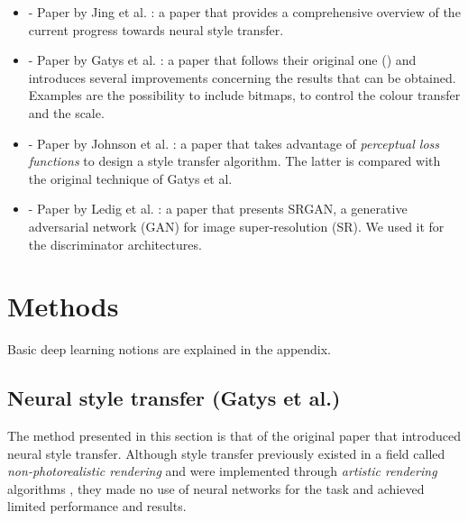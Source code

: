 \documentclass[twocolumn,superscriptaddress,aps,floatfix,nofootinbib]{revtex4-1}
\begin{document}
    \begin{itemize}
        \item \cite{DBLP:journals/corr/JingYFYS17} - Paper by Jing et al. :  a paper that provides a comprehensive overview of the current progress towards neural style transfer.
        \item \cite{DBLP:journals/corr/GatysEBHS16} - Paper by Gatys et al. : a paper that follows their original one (\cite{DBLP:journals/corr/GatysEB15a}) and introduces several improvements concerning the results that can be obtained. Examples are the possibility to include bitmaps, to control the colour transfer and the scale.
        \item \cite{DBLP:journals/corr/JohnsonAL16} - Paper by Johnson et al. : a paper that takes advantage of \emph{perceptual loss functions} to design a style transfer algorithm. The latter is compared with the original technique of Gatys et al.
        \item \cite{DBLP:journals/corr/LedigTHCATTWS16} - Paper by Ledig et al. : a paper that presents SRGAN, a generative adversarial network (GAN) for image super-resolution (SR). We used it for the discriminator architectures.
    \end{itemize}
    
    
    
    
    \section{Methods}
    
    Basic deep learning notions are explained in the appendix.
    
    \subsection{Neural style transfer (Gatys et al.)}\label{sec:methods.gatys}
    
    The method presented in this section is that of the original paper that introduced neural style transfer. Although style transfer previously existed in a field called \emph{non-photorealistic rendering} and were implemented through \emph{artistic rendering} algorithms \cite{DBLP:journals/corr/JingYFYS17}, they made no use of neural networks for the task and achieved limited performance and results.\\
    
\end{document}
